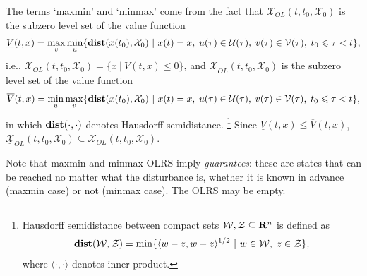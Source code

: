 \documentclass[letterpaper,10pt,english]{sphinxmanual}
\begin{document}
The terms ‘maxmin’ and ‘minmax’ come from the fact that
$\overline{{\mathcal X}}_{OL}(t, t_0, {\mathcal X}_0)$ is the
subzero level set of the value function
\label{main_source:equation-maxminvf}\begin{gather}
\begin{split}\underline{V}(t, x) =
\max_v\min_u\{{\bf dist}(x(t_0), {\mathcal X}_0) ~|~ x(t)=x, \; u(\tau)\in{\mathcal U}(\tau), \;
v(\tau)\in{\mathcal V}(\tau), \; t_0\leqslant\tau<t\},\end{split}\label{main_source-maxminvf}
\end{gather}
i.e.,
$\overline{{\mathcal X}}_{OL}(t, t_0, {\mathcal X}_0) = \{ x~|~\underline{V}(t, x) \leqslant0\}$,
and $\underline{{\mathcal X}}_{OL}(t, t_0, {\mathcal X}_0)$ is the
subzero level set of the value function
\label{main_source:equation-minmaxvf}\begin{gather}
\begin{split}\overline{V}(t, x) =
\min_u\max_v\{{\bf dist}(x(t_0), {\mathcal X}_0) ~|~ x(t)=x, \; u(\tau)\in{\mathcal U}(\tau), \;
v(\tau)\in{\mathcal V}(\tau), \; t_0\leqslant\tau<t\},\end{split}\label{main_source-minmaxvf}
\end{gather}
in which ${\bf dist}(\cdot, \cdot)$ denotes Hausdorff
semidistance. \footnote{
Hausdorff semidistance between compact sets
${\mathcal W}, {\mathcal Z}\subseteq {\bf R}^n$ is defined as
\begin{gather}
\begin{split}{\bf dist}({\mathcal W}, {\mathcal Z}) = \min\{\langle w-z, w-z\rangle^{1/2}
~|~ w\in{\mathcal W}, \; z\in{\mathcal Z}\},\end{split}\notag
\end{gather}
where $\langle\cdot, \cdot\rangle$ denotes inner product.
} Since
$\underline{V}(t, x)\leqslant\overline{V}(t, x)$,
$\underline{{\mathcal X}}_{OL}(t, t_0, {\mathcal X}_0)\subseteq\overline{{\mathcal X}}_{OL}(t, t_0, {\mathcal X}_0)$.

Note that maxmin and minmax OLRS imply \emph{guarantees}: these are states
that can be reached no matter what the disturbance is, whether it is
known in advance (maxmin case) or not (minmax case). The OLRS may be
empty.
\end{document}
